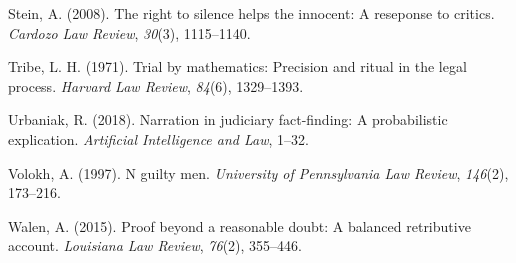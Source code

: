 \documentclass[10pt,dvipsnames]{scrartcl}
\begin{document}
\hypertarget{ref-stein2008}{}
Stein, A. (2008). The right to silence helps the innocent: A reseponse
to critics. \emph{Cardozo Law Review}, \emph{30}(3), 1115--1140.

\hypertarget{ref-tribe71}{}
Tribe, L. H. (1971). Trial by mathematics: Precision and ritual in the
legal process. \emph{Harvard Law Review}, \emph{84}(6), 1329--1393.

\hypertarget{ref-Urbaniak2017Narration-in-ju}{}
Urbaniak, R. (2018). Narration in judiciary fact-finding: A
probabilistic explication. \emph{Artificial Intelligence and Law},
1--32.

\hypertarget{ref-voloch1997}{}
Volokh, A. (1997). N guilty men. \emph{University of Pennsylvania Law
Review}, \emph{146}(2), 173--216.

\hypertarget{ref-walen2015}{}
Walen, A. (2015). Proof beyond a reasonable doubt: A balanced
retributive account. \emph{Louisiana Law Review}, \emph{76}(2),
355--446.
\end{document}
